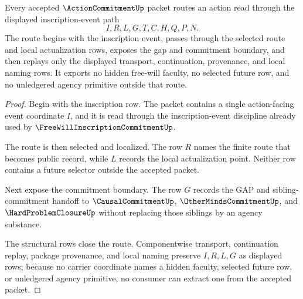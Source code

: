 \begin{theorem}
\label{thm:action-commitment-inscription-route}
Every accepted $\ActionCommitmentUp$ packet routes an action read through the displayed inscription-event path
$$
I,R,L,G,T,C,H,Q,P,N.
$$
The route begins with the inscription event, passes through the selected route and local actualization rows, exposes the gap and commitment boundary, and then replays only the displayed transport, continuation, provenance, and local naming rows. It exports no hidden free-will faculty, no selected future row, and no unledgered agency primitive outside that route.
\end{theorem}
\begin{proof}
Begin with the inscription row. The packet contains a single action-facing event coordinate $I$, and it is read through the inscription-event discipline already used by $\FreeWillInscriptionCommitmentUp$.

The route is then selected and localized. The row $R$ names the finite route that becomes public record, while $L$ records the local actualization point. Neither row contains a future selector outside the accepted packet.

Next expose the commitment boundary. The row $G$ records the GAP and sibling-commitment handoff to $\CausalCommitmentUp$, $\OtherMindsCommitmentUp$, and $\HardProblemClosureUp$ without replacing those siblings by an agency substance.

The structural rows close the route. Componentwise transport, continuation replay, package provenance, and local naming preserve $I,R,L,G$ as displayed rows; because no carrier coordinate names a hidden faculty, selected future row, or unledgered agency primitive, no consumer can extract one from the accepted packet.
\end{proof}




